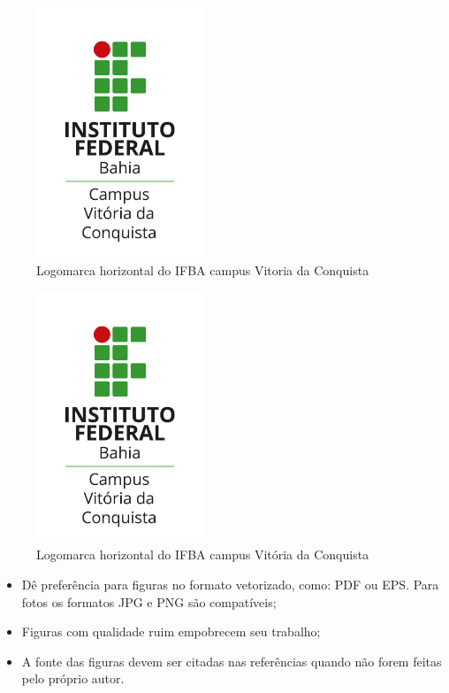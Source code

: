 \begin{Codigo}[language=tex, 
    caption=Sintaxe para adicionar Figuras no Texto, 
    label=cod:Figs]
 \begin{figure}[htb]
   \centering
   \includegraphics[width=5cm]{arquivos/LogoIFBA-VDC-V.pdf}
   \caption{Logomarca horizontal do IFBA campus Vitoria 
   da Conquista}
   \label{fig:LogoIFBAv}
 \end{figure}
\end{Codigo}

\vspace{-1cm}
\begin{figure}[htb]
    \centering
    \includegraphics[width=5cm]{arquivos/LogoIFBA-VDC-V.pdf}
    \caption{Logomarca horizontal do IFBA campus Vitória da Conquista}
    \label{fig:LogoIFBAv}
\end{figure}

\begin{CaixaVerde}
    \begin{itemize}
        \item Dê preferência para figuras no formato vetorizado, como: PDF ou EPS. Para fotos os formatos JPG e PNG são compatíveis;
        \item Figuras com qualidade ruim empobrecem seu trabalho;
        \item A fonte das figuras devem ser citadas nas referências quando não forem feitas pelo próprio autor.
        \end{itemize}
\end{CaixaVerde}

